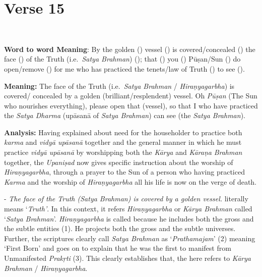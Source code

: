 \chapter{Verse 15}

\begin{moolashloka}
\\
\end{moolashloka}

\textbf{Word to word Meaning}: By the golden () vessel () is covered/concealed () the face () of the Truth (i.e.\ \emph{Satya Brahman}) (); that () you () Pūṣan/Sun () do open/remove () for me who has practiced the tenets/law of Truth () to see ().

\textbf{Meaning:} The face of the Truth (i.e.\ \emph{Satya Brahman} / \emph{Hiraṇyagarbha}) is covered/ concealed by a golden (brilliant/resplendent) vessel. Oh \emph{Pūṣan} (The Sun who nourishes everything), please open that (vessel), so that I who have practiced the \emph{Satya Dharma} (upāsanā of \emph{Satya Brahman}) can see (the \emph{Satya Brahman}).

\textbf{Analysis:} Having explained about need for the householder to practice both \emph{karma} and \emph{vidyā upāsanā} together and the general manner in which he must practice \emph{vidyā upāsanā} by worshipping both the \emph{Kārya} and \emph{Kāraṇa} \emph{Brahman} together, the \emph{Upaniṣad} now gives specific instruction about the worship of \emph{Hiraṇyagarbha}, through a prayer to the Sun of a person who having practiced \emph{Karma} and the worship of \emph{Hiraṇyagarbha} all his life is now on the verge of death.

- \emph{The face of the Truth (Satya Brahman) is covered by a golden vessel.}  literally means `\emph{Truth'}. In this context, it refers \emph{Hiraṇyagarbha} or \emph{Kārya Brahman} called `\emph{Satya Brahman}'. \emph{Hiraṇyagarbha} is called  because he includes both the gross and the subtle entities (1). He projects both the gross and the subtle universes. Further, the scriptures clearly call \emph{Satya Brahman} as `\emph{Prathamajam}' (2) meaning `First Born' and goes on to explain that he was the first to manifest from Unmanifested \emph{Prakṛti} (3). This clearly establishes that, the  here refers to \emph{Kārya Brahman} / \emph{Hiraṇyagarbha}.

